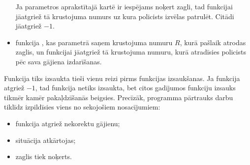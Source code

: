 \documentclass{boi2014-lv}
\begin{document}
\begin{itemize}
	Ja parametros aprakstītajā kartē ir iespējams noķert zagli, tad funkcijai  jāatgriež tā krustojuma numurs uz kura policists izvēlas patrulēt. Citādi jāatgriež $-1$.

        \item funkcija , kas parametrā saņem krustojuma numuru $R$, kurā pašlaik atrodas zaglis, un funkcijai jāatgriež tā krustojuma numuru, kurā atradīsies policists pēc sava gājiena izdarīšanas.
    \end{itemize}

	Funkcija  tiks izsaukta tieši vienu reizi pirms funkcijas  izsaukšanas. Ja funkcija  atgriež $-1$, tad funkcija  netiks izsaukta, bet citos gadījumos funkciju  izsauks tikmēr kamēr pakaļdzīšanās beigsies. Precīzāk, programma pārtrauks darbu tiklīdz izpildīsies viens no sekojošiem nosacījumiem:
    \begin{itemize}
        \item funkcija  atgriež nekorektu gājienu;%
        \item situācija atkārtojas;%
        \item zaglis tiek noķerts.%
    \end{itemize}
\end{document}
